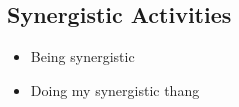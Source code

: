 \subsection{Synergistic Activities}
\begin{itemize}
\item Being synergistic
\item Doing my synergistic thang
\end{itemize}